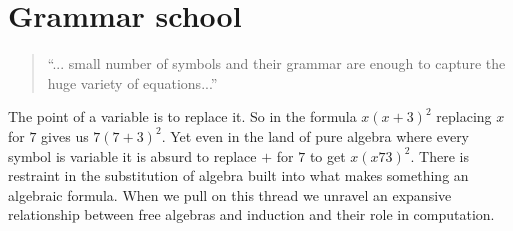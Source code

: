 \chapter{Grammar school}

\begin{quote}
``... small number
of symbols and their grammar are enough to capture the huge
variety of equations...''
\end{quote}

The point of a variable is to replace it.  So in the formula 
$x(x+3)^2$ replacing $x$ for $7$ gives us $7(7+3)^2$.  
Yet even in the land of pure algebra where every symbol is variable it is absurd to
replace $+$ for $7$ to get $x(x73)^2$.   There is restraint in the substitution
of algebra built into what makes something an algebraic formula. When we pull 
on this thread we unravel an expansive relationship between free algebras and induction
and their role in computation.


